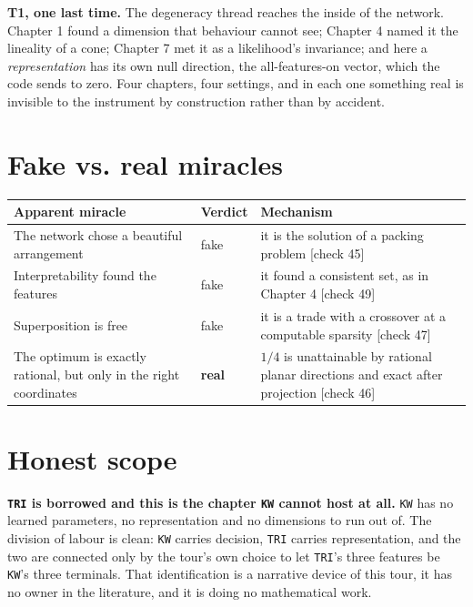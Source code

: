 \textbf{T1, one last time.} The degeneracy thread reaches the inside of the network. Chapter 1 found a dimension that behaviour cannot see; Chapter 4 named it the lineality of a cone; Chapter 7 met it as a likelihood's invariance; and here a \emph{representation} has its own null direction, the all-features-on vector, which the code sends to zero. Four chapters, four settings, and in each one something real is invisible to the instrument by construction rather than by accident.

\section*{Fake vs. real miracles}

\noindent

\noindent
\begin{tabularx}{\textwidth}{XXX}
\toprule
Apparent miracle & Verdict & Mechanism \\
\midrule
The network chose a beautiful arrangement & fake & it is the solution of a packing problem [check 45] \\
Interpretability found the features & fake & it found a consistent set, as in Chapter 4 [check 49] \\
Superposition is free & fake & it is a trade with a crossover at a computable sparsity [check 47] \\
The optimum is exactly rational, but only in the right coordinates & \textbf{real} & $1/4$ is unattainable by rational planar directions and exact after projection [check 46] \\
\bottomrule
\end{tabularx}
\par\medskip

\section*{Honest scope}

\textbf{\texttt{TRI} is borrowed and this is the chapter \texttt{KW} cannot host at all.} \texttt{KW} has no learned parameters, no representation and no dimensions to run out of. The division of labour is clean: \texttt{KW} carries decision, \texttt{TRI} carries representation, and the two are connected only by the tour's own choice to let \texttt{TRI}'s three features be \texttt{KW}'s three terminals. That identification is a narrative device of this tour, it has no owner in the literature, and it is doing no mathematical work.

